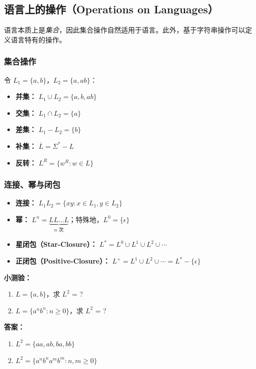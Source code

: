 \documentclass[12pt,a4paper]{ctexart}
\begin{document}
\subsection{语言上的操作（Operations on Languages）}

\begin{keybox}
  语言本质上是\emph{集合}，因此集合操作自然适用于语言。此外，基于字符串操作可以定义语言特有的操作。
\end{keybox}

\subsubsection{集合操作}

令 $L_1 = \{a, b\}$，$L_2 = \{a, ab\}$：

\begin{itemize}[itemsep=0.2em]
  \item \textbf{并集：} $L_1 \cup L_2 = \{a, b, ab\}$
  \item \textbf{交集：} $L_1 \cap L_2 = \{a\}$
  \item \textbf{差集：} $L_1 - L_2 = \{b\}$
  \item \textbf{补集：} $\overline{L} = \Sigma^* - L$
  \item \textbf{反转：} $L^R = \{w^R : w \in L\}$
\end{itemize}

\subsubsection{连接、幂与闭包}

\begin{itemize}[itemsep=0.3em]
  \item \textbf{连接：} $L_1L_2 = \{xy : x \in L_1, y \in L_2\}$
  \item \textbf{幂：} $L^n = \underbrace{LL\dots L}_{n\text{ 次}}$；特殊地，$L^0 = \{\epsilon\}$
  \item \textbf{星闭包（Star-Closure）：} $L^* = L^0 \cup L^1 \cup L^2 \cup \cdots$
  \item \textbf{正闭包（Positive-Closure）：} $L^+ = L^1 \cup L^2 \cup \cdots = L^* - \{\epsilon\}$
\end{itemize}

\begin{notebox}
  \textbf{小测验：}
  \begin{enumerate}
    \item $L = \{a, b\}$，求 $L^2$ = ?
    \item $L = \{a^n b^n : n \geq 0\}$，求 $L^2$ = ?
  \end{enumerate}
  \textbf{答案：}
  \begin{enumerate}
    \item $L^2 = \{aa, ab, ba, bb\}$
    \item $L^2 = \{a^n b^n a^m b^m : n, m \geq 0\}$
  \end{enumerate}
\end{notebox}
\end{document}

